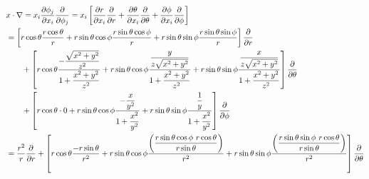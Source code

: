 \begin{align}
&
    \bm{x} \cdot \nabla
=
    x_i
    \dfrac{\partial \phi_j}
        {\partial x_i}
    \dfrac{\partial}{\partial \phi_j}
=
    x_i
    \left[
        \dfrac{\partial r}
            {\partial x_i}
        \dfrac{\partial}{\partial r}
    +
        \dfrac{\partial \theta}
            {\partial x_i}
        \dfrac{\partial}{\partial \theta}
    +
        \dfrac{\partial \phi}
            {\partial x_i}
        \dfrac{\partial}{\partial \phi}
    \right]
\notag\\&
=
    \left[
        r \cos \theta
        \dfrac{r \cos \theta}{r}
    +
        r \sin \theta \cos \phi
        \dfrac{r \sin \theta \cos \phi}{r}
    +
        r \sin \theta \sin \phi
        \dfrac{r \sin \theta \sin \phi}{r}
    \right]
    \dfrac{\partial}{\partial r}
\notag\\&\qquad
    +
    \left[
        r \cos \theta
        \dfrac{
            - \dfrac{
                \sqrt{x^2 + y^2}
            }{z^2}
        }{
            1 + \dfrac{x^2 + y^2}{z^2}
        }
    +
        r \sin \theta \cos \phi
        \dfrac{
            \dfrac{ y }{z \sqrt{x^2 + y^2}}
        }{
            1 + \dfrac{x^2 + y^2}{z^2}
        }
    +
        r \sin \theta \sin \phi
        \dfrac{
            \dfrac{ x }{z \sqrt{x^2 + y^2}}
        }{
            1 + \dfrac{x^2 + y^2}{z^2}
        }
    \right]
    \dfrac{\partial}{\partial \theta}
\notag\\&\qquad
    +
    \left[
        r \cos \theta
        \cdot 0
    +
        r \sin \theta \cos \phi
        \dfrac{
            - \dfrac{ x }{y^2}
        }{
            1 + \dfrac{x^2}{y^2}
        }
    +
        r \sin \theta \sin \phi
        \dfrac{
            \dfrac{ 1 }{y}
        }{
            1 + \dfrac{x^2}{y^2}
        }
    \right]
    \dfrac{\partial}{\partial \phi}
\notag\\&
=
    \dfrac{ r^2 }{ r }
    \dfrac{\partial}{\partial r}
    +
    \left[
        r \cos \theta
        \dfrac{
            - r \sin \theta
        }{ r^2 }
    +
        r \sin \theta \cos \phi
        \dfrac{\left(
            \dfrac{
                r \sin \theta
                \cos \phi\ 
                r \cos \theta
            }{
                r \sin \theta
            }
        \right)}{ r^2 }
    +
        r \sin \theta \sin \phi
        \dfrac{\left(
            \dfrac{
                r \sin \theta
                \sin \phi\ 
                r \cos \theta
            }{r \sin \theta}
        \right)}{ r^2 }
    \right]
    \dfrac{\partial}{\partial \theta}

\end{align}
